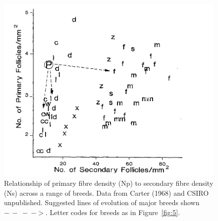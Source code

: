 %

\begin{figure}[h]
  \centering
  \includegraphics[width=1.3\textwidth, trim = 80 0 0 120]{images/fig6ri.png}
  \caption{ Relationship of primary fibre density (Np) to secondary fibre
      density (Ns) across a range of breeds.  Data from Carter (1968)
      and CSIRO unpublished.  Suggested lines of evolution of major
      breeds shown $-\ -\ -\ ->$. 
      Letter codes for breeds as in Figure~\ref{fig:5}.}
  \label{fig:6}
\end{figure}

%
